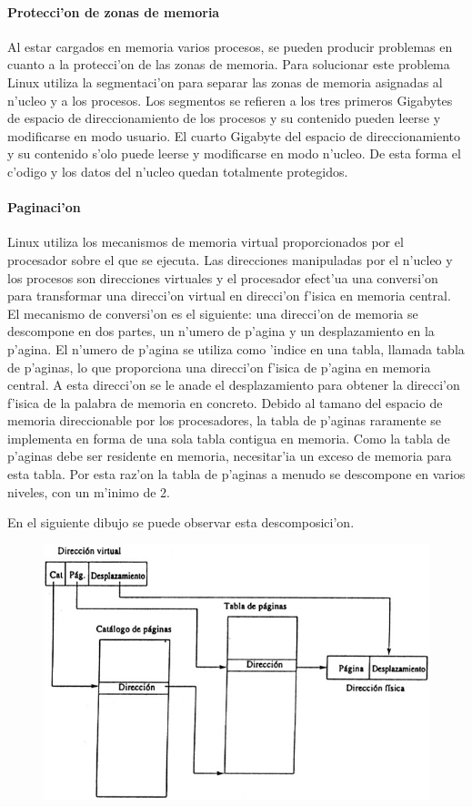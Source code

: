 \paragraph{Protecci'on de zonas de memoria}
Al estar cargados en memoria varios procesos, se pueden producir problemas en cuanto a la protecci'on de las zonas de memoria. Para solucionar este problema Linux utiliza la segmentaci'on para separar las zonas de memoria asignadas al n'ucleo y a los procesos. Los segmentos se refieren a los tres primeros Gigabytes de espacio de direccionamiento de los procesos y su contenido pueden leerse y modificarse en modo usuario. El cuarto Gigabyte del espacio de direccionamiento y su contenido s'olo puede leerse y modificarse en modo n'ucleo. De esta forma el c'odigo y los datos del n'ucleo quedan totalmente protegidos.
\paragraph{Paginaci'on}
Linux utiliza los mecanismos de memoria virtual proporcionados por el procesador sobre el que se ejecuta. Las direcciones manipuladas por el n'ucleo y los procesos son direcciones virtuales y el procesador efect'ua una conversi'on para transformar una direcci'on virtual en direcci'on f'isica en memoria central.
El mecanismo de conversi'on es el siguiente: una direcci'on de memoria se descompone en dos partes, un n'umero de p'agina y un desplazamiento en la p'agina. El n'umero de p'agina se utiliza como 'indice en una tabla, llamada tabla de p'aginas, lo que proporciona una direcci'on f'isica de p'agina en memoria central. A esta direcci'on se le anade el desplazamiento para obtener la direcci'on f'isica de la palabra de memoria en concreto.
Debido al tamano del espacio de memoria direccionable por los procesadores, la tabla de p'aginas raramente se implementa en forma de una sola tabla contigua en memoria. Como la tabla de p'aginas debe ser residente en memoria, necesitar'ia un exceso de memoria para esta tabla. Por esta raz'on la tabla de p'aginas a menudo se descompone en varios niveles, con un m'inimo de 2.

En el siguiente dibujo se puede observar esta descomposici'on.

\begin{figure}[h]
\centering
\includegraphics[scale=0.5]{imagememory.png}
\end{figure}

